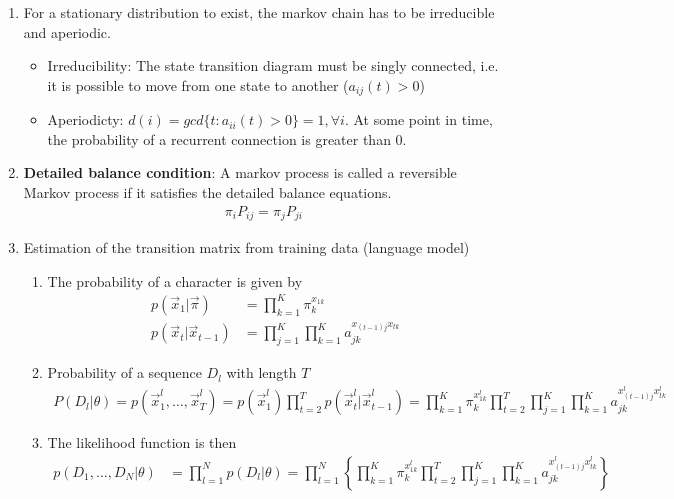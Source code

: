 \documentclass[12pt,twoside]{article}
\begin{document}
\begin{enumerate}
		\item For a stationary distribution to exist, the markov chain has to be irreducible and aperiodic.
			\begin{itemize}
				\item Irreducibility: The state transition diagram must be singly connected, i.e. it is possible to move from one state to another ($a_{ij}(t)>0$)
				\item Aperiodicty: $d(i) = gcd\lbrace t: a_{ii}(t)>0\rbrace =1, \forall i$. At some point in time, the probability of a recurrent connection is greater than 0.
			\end{itemize}
	
		\item \textbf{Detailed balance condition}: A markov process is called a reversible Markov process if it satisfies the detailed balance equations.
			\begin{align*}
				\pi_i P_{ij} = \pi_j P_{ji}
			\end{align*}
	
		\item Estimation of the transition matrix from training data (language model)\\
			\begin{enumerate}
				\item The probability of a character is given by
					\begin{align*}
						p(\vec{x}_1\vert \vec{\pi}) & = \prod_{k=1}^K \pi_k^{x_{1k}}\\
						p(\vec{x}_t\vert \vec{x}_{t-1}) & = \prod_{j=1}^K \prod_{k=1}^K a_{jk}^{x_{(t-1)j}x_{tk}}				
					\end{align*}
					
				\item Probability of a sequence $D_l$ with length $T$
					\begin{align*}
						P(D_l\vert \theta) 
						 = p(\vec{x}_1^l, \ldots, \vec{x}_T^l)
						 = p(\vec{x}_1^l) \prod_{t=2}^T p(\vec{x}_t^l \vert \vec{x}_{t-1}^l)
						 = \prod_{k=1}^K \pi_k^{x_{1k}^l}\prod_{t=2}^T\prod_{j=1}^K \prod_{k=1}^K a_{jk}^{x^l_{(t-1)j}x^l_{tk}}	
					\end{align*}
					
				\item The likelihood function is then
					\begin{align*}
						p(D_1,\ldots, D_N\vert \theta) 
						& = \prod_{l=1}^N p(D_l\vert \theta)
						 = \prod_{l=1}^N \left\lbrace  \prod_{k=1}^K \pi_k^{x_{1k}^l}\prod_{t=2}^T\prod_{j=1}^K \prod_{k=1}^K a_{jk}^{x^l_{(t-1)j}x^l_{tk}} \right\rbrace
					\end{align*}
					

\end{enumerate}
\end{enumerate}
\end{document}
